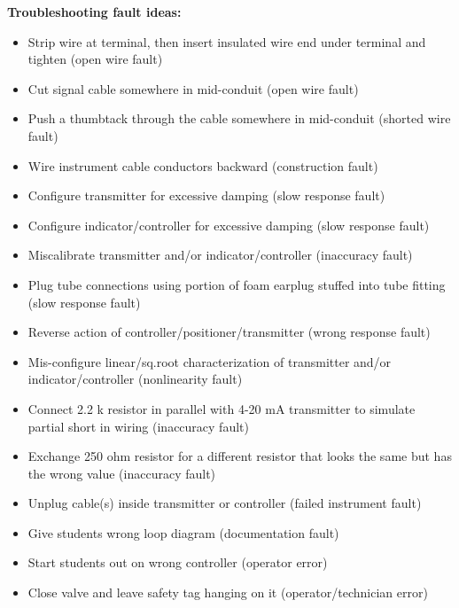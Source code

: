 \noindent
{\bf Troubleshooting fault ideas:}

\begin{itemize}
\goodbreak
\item{} Strip wire at terminal, then insert insulated wire end under terminal and tighten (open wire fault)
\item{} Cut signal cable somewhere in mid-conduit (open wire fault)
\item{} Push a thumbtack through the cable somewhere in mid-conduit (shorted wire fault)
\item{} Wire instrument cable conductors backward (construction fault)
\item{} Configure transmitter for excessive damping (slow response fault)
\item{} Configure indicator/controller for excessive damping (slow response fault)
\item{} Miscalibrate transmitter and/or indicator/controller (inaccuracy fault)
\item{} Plug tube connections using portion of foam earplug stuffed into tube fitting (slow response fault)
\item{} Reverse action of controller/positioner/transmitter (wrong response fault)
\item{} Mis-configure linear/sq.root characterization of transmitter and/or indicator/controller (nonlinearity fault)
\item{} Connect 2.2 k resistor in parallel with 4-20 mA transmitter to simulate partial short in wiring (inaccuracy fault)
\item{} Exchange 250 ohm resistor for a different resistor that looks the same but has the wrong value (inaccuracy fault) 
\item{} Unplug cable(s) inside transmitter or controller (failed instrument fault)
\item{} Give students wrong loop diagram (documentation fault)
\item{} Start students out on wrong controller (operator error)
\item{} Close valve and leave safety tag hanging on it (operator/technician error)
\end{itemize}













\vfil \eject

